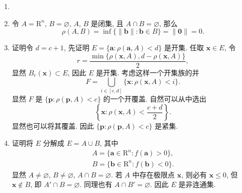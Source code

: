 \documentclass[a4paper, 11pt]{ctexart}
\begin{document}
\begin{enumerate}
    \item %
    \item %
        令 $A = \mathrm{R}^n$, $B = \varnothing$, $A$, $B$ 是闭集, 且 $A \cap B = \varnothing$, 那么
        \[
            \rho(A, B) = \inf\{\|\boldsymbol{b}\|: \boldsymbol{b} \in B\} = \|\boldsymbol{0}\| = 0.  
        \]
    \item %
        {\heiti 证明}\quad 令 $d = c + 1$, 先证明 $E = \{\boldsymbol{a} : \rho(\boldsymbol{a}, A) < d\}$ 是开集. 任取 $\boldsymbol{x} \in E$,
        令
        \[
            r = \frac{\min\{\rho(\boldsymbol{x}, A), d - \rho(\boldsymbol{x}, A)\}}{2},   
        \]
        显然 $B_r(\boldsymbol{x}) \subset E$, 因此 $E$ 是开集. 考虑这样一个开集族的并
        \[
            F = \bigcup_{i\in[c, d]}\{\boldsymbol{x} : \rho(\boldsymbol{x}, A) < i\}.
        \]
        显然 $F$ 是 $\{\boldsymbol{p} : \rho(\boldsymbol{p}, A) < c\}$ 的一个开覆盖. 自然可以从中选出
        \[
            \left\{\boldsymbol{x} : \rho(\boldsymbol{x}, A) < \frac{c + d}{2}\right\}.    
        \] 显然也可以将其覆盖. 因此 $\{\boldsymbol{p} : \rho(\boldsymbol{p}, A) < c\}$ 是紧集. 
    \item %
        {\heiti 证明}\quad 将 $E$ 分解成 $E = A \cup B$, 其中
        \begin{align*}
            A = \{\boldsymbol{a} \in \mathrm{R}^n : f(\boldsymbol{a}) > 0\}, \\
            B = \{\boldsymbol{b} \in \mathrm{R}^n : f(\boldsymbol{b}) < 0\}.    
        \end{align*}
        显然 $A \neq \varnothing$, $B \neq \varnothing$, $A \cap B = \varnothing$. 若 $A$ 中存在极限点 $\boldsymbol{x}$, 则必有 $\boldsymbol{x} \leqslant 0$,
        但 $\boldsymbol{x} \notin B$, 即 $A' \cap B = \varnothing$. 同理也有 $A \cap B' = \varnothing$. 因此 $E$ 是非连通集.
\end{enumerate}
\end{document}
